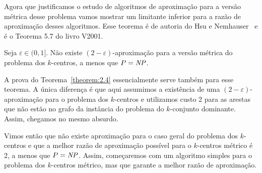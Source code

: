     Agora que justificamos o estudo de algoritmos de aproximação para a versão métrica desse problema vamos mostrar um limitante inferior para a razão de aproximação desses algoritmos. Esse teorema é de autoria do Hsu e Nemhauser~\cite{HSU1979209} e é o Teorema 5.7 do livro V2001.
    
    \begin{theorem}
        Seja $\varepsilon \in (0,1]$. Não existe $(2-\varepsilon)$-aproximação para a versão métrica do problema dos $k$-centros, a menos que $P=\mathit{NP}$.
    \end{theorem}
    A prova do Teorema~\ref{theorem:2.4} essencialmente serve também para esse teorema. A única diferença é que aqui assumimos a existência de uma $(2 - \varepsilon)$-aproximação para o problema dos $k$-centros e utilizamos custo 2 para as arestas que não estão no grafo da instância do problema do $k$-conjunto dominante. Assim, chegamos no mesmo absurdo.

    Vimos então que não existe aproximação para o caso geral do problema dos $k$-centros e que a melhor razão de aproximação possível para o $k$-centros métrico é 2, a menos que $P = \mathit{NP}$. Assim, começaremos com um algoritmo simples para o problema dos $k$-centros métrico, mas que garante a melhor razão de aproximação.